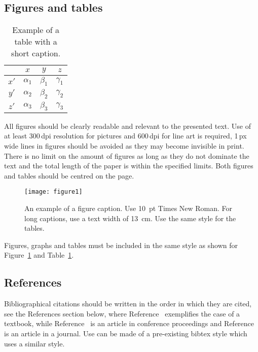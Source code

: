 \documentclass{icsc}
\begin{document}
\subsection{Figures and tables}
%
\begin{table}[h!]
  \begin{center}
    \caption{Example of a table with a short caption.} \label{tab:tab1}
    \begin{tabular}{|c|ccc|}
      \hline
      &  $x$  &  $y$  &  $z$ \\
      \hline
      $x'$  &  $\alpha_1$ & $\beta_1$ & $\gamma_1$ \\
      $y'$  &  $\alpha_2$ & $\beta_2$ & $\gamma_2$ \\
      $z'$  &  $\alpha_3$ & $\beta_3$ & $\gamma_3$ \\
      \hline
    \end{tabular}
  \end{center}
\end{table}
All figures should be clearly readable and relevant to the presented text. Use
of at least 300\,dpi resolution for pictures and 600\,dpi for line art is
required, 1\,px wide lines in figures should be avoided as they may become
invisible in print. There is no limit on the amount of figures as long as they
do not dominate the text and the total length of the paper is within the
specified limits. Both figures and tables should be centred on the page.

\begin{figure}[h!]
\begin{center}
  \texttt{[image: figure1]}
  \caption{An example of a figure caption. Use 10~pt Times New Roman.
           For long captions, use a text width of 13~cm.
           Use the same style for the tables.} \label{fig:fig1}
\end{center}
\end{figure}
Figures, graphs and tables must be included in the same style as shown for
Figure~\ref{fig:fig1} and Table~\ref{tab:tab1}.


\subsection{References}
%
Bibliographical citations should be written in the order in which they are
cited, see the References section below, where Reference~\cite{Pac02}
exemplifies the case of a textbook, while Reference~\cite{Ber07} is an article
in conference proceedings and Reference~\cite{Sha71} is an article in a
journal. Use can be made of a pre-existing bibtex style which uses a similar
style.
\end{document}
